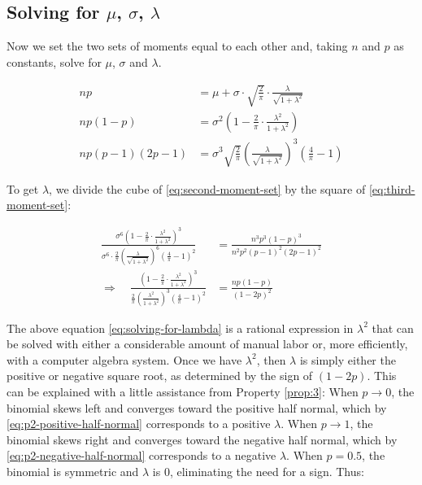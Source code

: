 \subsection{Solving for $\mu$, $\sigma$, $\lambda$}

Now we set the two sets of moments equal to each other and, taking $n$ and $p$
as constants, solve for $\mu$, $\sigma$ and $\lambda$.

\begin{subequations}
\begin{align}
  np &= \mu + \sigma \cdot \sqrt{\frac{2}{\pi}} \cdot \frac{\lambda}{\sqrt{1 + \lambda^2}} \label{eq:first-moment-set} \\
  np(1-p) &= \sigma^2 \left( 1 - \frac{2}{\pi} \cdot \frac{\lambda^2}{1 + \lambda^2} \right) \label{eq:second-moment-set} \\
  np(p-1)(2p-1) &= \sigma^3 \sqrt{\frac{2}{\pi}} \left( \frac{\lambda}{\sqrt{1 + \lambda^2}} \right)^3 \left( \frac{4}{\pi} - 1 \right) \label{eq:third-moment-set}
\end{align}
\end{subequations}

To get $\lambda$, we divide the cube of \eqref{eq:second-moment-set} by the
square of \eqref{eq:third-moment-set}:

\begin{align}
  \frac{\sigma^6 \left( 1 - \frac{2}{\pi} \cdot \frac{\lambda^2}{1 + \lambda^2} \right)^3}{\sigma^6 \cdot \frac{2}{\pi} \left( \frac{\lambda}{\sqrt{1 + \lambda^2}} \right)^6 \left(
    \frac{4}{\pi} - 1 \right)^2} &= \frac{n^3p^3(1-p)^3}{n^2p^2(p-1)^2(2p-1)^2} \nonumber \\
  \Rightarrow \quad \frac{\left( 1 - \frac{2}{\pi} \cdot \frac{\lambda^2}{1+\lambda^2} \right)^3}{\frac{2}{\pi} \left( \frac{\lambda^2}{1+\lambda^2} \right)^3 \left( \frac{4}{\pi} - 1
    \right)^2} &= \frac{np(1-p)}{(1-2p)^2} \label{eq:solving-for-lambda}
\end{align}

The above equation \eqref{eq:solving-for-lambda} is a rational expression in
$\lambda^2$ that can be solved with either a considerable amount of manual
labor or, more efficiently, with a computer algebra system. Once we have
$\lambda^2$, then $\lambda$ is simply either the positive or negative square
root, as determined by the sign of $(1-2p)$. This can be explained with a
little assistance from Property \ref{prop:3}: When $p \to 0$, the binomial
skews left and converges toward the positive half normal, which by
\eqref{eq:p2-positive-half-normal} corresponds to a positive $\lambda$. When $p
\to 1$, the binomial skews right and converges toward the negative half normal,
which by \eqref{eq:p2-negative-half-normal} corresponds to a negative
$\lambda$. When $p = 0.5$, the binomial is symmetric and $\lambda$ is 0,
eliminating the need for a sign. Thus:

